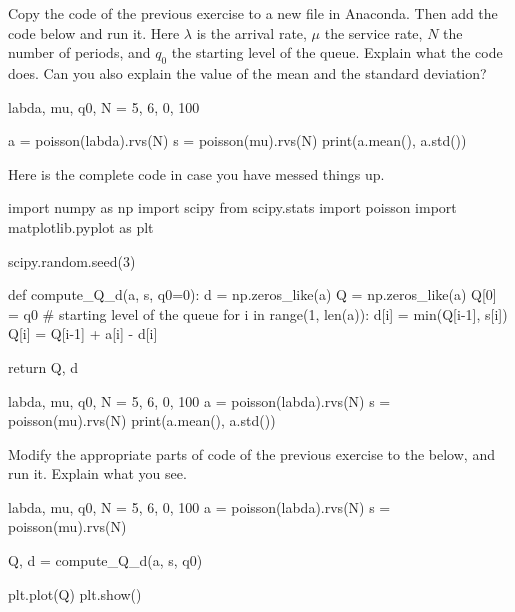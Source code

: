\begin{exercise}\label{ex:4}
Copy the code of the previous exercise to a new file in Anaconda. Then add the code below and run it. Here $\lambda$ is the arrival rate, $\mu$ the service rate, $N$ the number of periods, and $q_0$ the starting level of the queue. Explain what the code does. Can you also explain the value of the mean and the standard deviation? 

  \begin{pyverbatim}

labda, mu, q0, N = 5, 6, 0, 100

a = poisson(labda).rvs(N)
s = poisson(mu).rvs(N)
print(a.mean(), a.std())
\end{pyverbatim}
\begin{solution}
  Here is the complete code in case you have messed things up.

\begin{pyverbatim}
import numpy as np
import scipy
from scipy.stats import poisson
import matplotlib.pyplot as plt

scipy.random.seed(3) 


def compute_Q_d(a, s, q0=0):
    d = np.zeros_like(a)
    Q = np.zeros_like(a)
    Q[0] = q0 # starting level of the queue
    for i in range(1, len(a)):
        d[i] = min(Q[i-1], s[i])
        Q[i] = Q[i-1] + a[i] - d[i]

    return Q, d


labda, mu, q0, N = 5, 6, 0, 100
a = poisson(labda).rvs(N)
s = poisson(mu).rvs(N)
print(a.mean(), a.std())
\end{pyverbatim}

\end{solution}
\end{exercise}

\begin{exercise}
  Modify  the appropriate parts of  code of the previous exercise to the below,  and run it. Explain what you see.

  \begin{pyverbatim}
labda, mu, q0, N = 5, 6, 0, 100
a = poisson(labda).rvs(N)
s = poisson(mu).rvs(N)

Q, d = compute_Q_d(a, s, q0)

plt.plot(Q)
plt.show()
  \end{pyverbatim}
\end{exercise}


